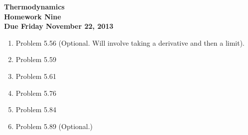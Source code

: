 \documentclass[12pt]{article}
\begin{document}
\pagestyle{empty}
 
\begin{center}
{\large {\bf Thermodynamics}}\\
\medskip
{\large {\bf Homework Nine}}\\
\medskip
{ {\bf Due Friday November 22, 2013}}\\
\end{center}
\bigskip
\begin{enumerate}

  \item Problem 5.56 (Optional.  Will involve taking a derivative and
    then a limit). 
  \item Problem 5.59
  \item Problem 5.61
  \item Problem 5.76
  \item Problem 5.84
  \item Problem 5.89 (Optional.)

\end{enumerate}
\end{document}
